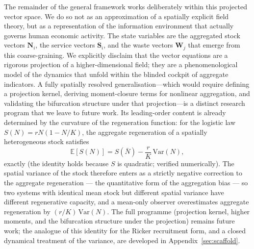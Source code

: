 \documentclass[twocolumn,10pt]{article}
\begin{document}
The remainder of the general framework works deliberately within this projected vector space. We do so not as an approximation of a spatially explicit field theory, but as a representation of the information environment that actually governs human economic activity. The state variables are the aggregated stock vectors \(\mathbf{N}_i\), the service vectors \(\mathbf{S}_i\), and the waste vectors \(\mathbf{W}_j\) that emerge from this coarse-graining. We explicitly disclaim that the vector equations are a rigorous projection of a higher-dimensional field; they are a phenomenological model of the dynamics that unfold within the blinded cockpit of aggregate indicators. A fully spatially resolved generalisation---which would require defining a projection kernel, deriving moment-closure terms for nonlinear aggregation, and validating the bifurcation structure under that projection---is a distinct research program that we leave to future work. Its leading-order content is already determined by the curvature of the regeneration function: for the logistic law $S(N)=rN(1-N/K)$, the aggregate regeneration of a spatially heterogeneous stock satisfies \[ \mathbb E[S(N)] = S(\bar N) - \frac{r}{K}\,\mathrm{Var}(N), \] exactly (the identity holds because $S$ is quadratic; verified numerically). The spatial variance of the stock therefore enters as a strictly negative correction to the aggregate regeneration --- the quantitative form of the aggregation bias --- so two systems with identical mean stock but different spatial variance have different regenerative capacity, and a mean-only observer overestimates aggregate regeneration by $(r/K)\,\mathrm{Var}(N)$. The full programme (projection kernel, higher moments, and the bifurcation structure under the projection) remains future work; the analogue of this identity for the Ricker recruitment form, and a closed dynamical treatment of the variance, are developed in Appendix~\ref{sec:scaffold}.
\end{document}
